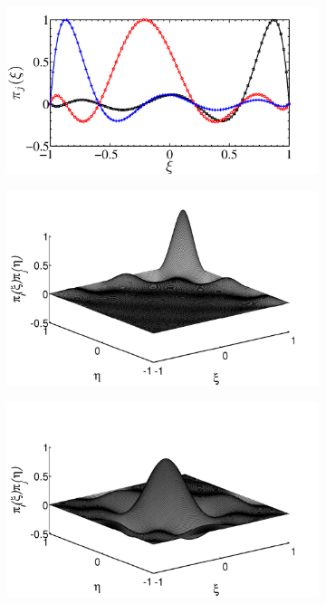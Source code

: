 \begin{figure}
\centering
        \begin{subfigure}[b]{0.75\textwidth}
                \includegraphics[width=\linewidth]{Figure/legpoly2.pdf}
                \caption{}
                \label{fig:poly1}
        \end{subfigure}
          \begin{subfigure}[b]{0.45\textwidth}
         \centering
                \includegraphics[width=\linewidth]{Figure/legpoly_2D1.pdf}
                 \caption{}
                 \label{fig:poly2}
         \end{subfigure}%
         \begin{subfigure}[b]{0.45\textwidth}
         \centering
                \includegraphics[width=\linewidth]{Figure/legpoly_2D2.pdf}

\end{subfigure}
\end{figure}
